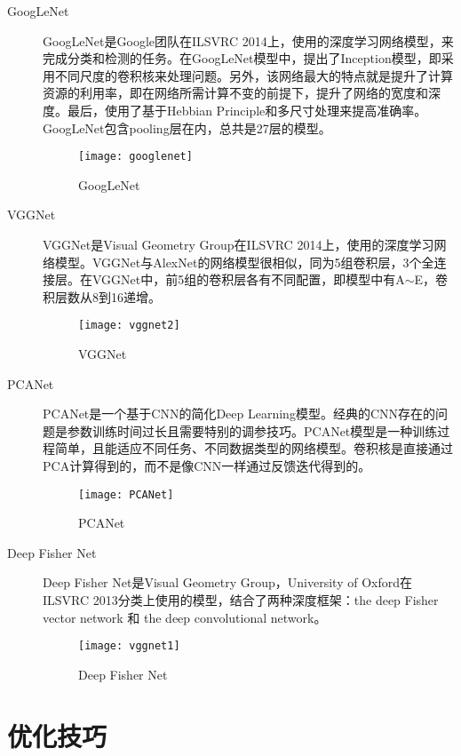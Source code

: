 \begin{description}
\item[GoogLeNet] GoogLeNet\cite{simonyan2014very}是Google团队在ILSVRC 2014上，使用的深度学习网络模型，来完成分类和检测的任务。在GoogLeNet模型中，提出了Inception模型，即采用不同尺度的卷积核来处理问题。另外，该网络最大的特点就是提升了计算资源的利用率，即在网络所需计算不变的前提下，提升了网络的宽度和深度。最后，使用了基于Hebbian Principle和多尺寸处理来提高准确率。GoogLeNet包含pooling层在内，总共是27层的模型。
\begin{figure}[!ht]
\centering
\texttt{[image: googlenet]}
\caption{GoogLeNet}
\end{figure}
\item[VGGNet] VGGNet\cite{szegedy2014going}是Visual Geometry Group在ILSVRC 2014上，使用的深度学习网络模型。VGGNet与AlexNet的网络模型很相似，同为5组卷积层，3个全连接层。在VGGNet中，前5组的卷积层各有不同配置，即模型中有A$\sim$E，卷积层数从8到16递增。%
\begin{figure}[!ht]
\centering
\texttt{[image: vggnet2]}
\caption{VGGNet}
\end{figure}

\item[PCANet] PCANet是一个基于CNN的简化Deep Learning模型。经典的CNN存在的问题是参数训练时间过长且需要特别的调参技巧。PCANet模型是一种训练过程简单，且能适应不同任务、不同数据类型的网络模型。卷积核是直接通过PCA计算得到的，而不是像CNN一样通过反馈迭代得到的。
\begin{figure}[!ht]
\centering
\texttt{[image: PCANet]}
\caption{PCANet}
\end{figure}

\item[Deep Fisher Net] Deep Fisher Net\cite{simonyan2013deep}是Visual Geometry Group，University of Oxford在ILSVRC 2013分类上使用的模型，结合了两种深度框架：the deep Fisher vector network 和 the deep convolutional network。
\begin{figure}[!ht]
\centering
\texttt{[image: vggnet1]}
\caption{Deep Fisher Net}
\end{figure}

\end{description}

\section{优化技巧}
